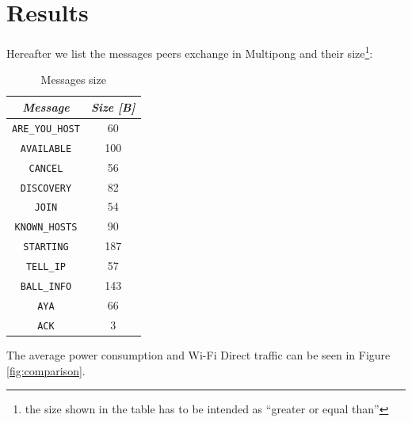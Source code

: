 \section{Results}

Hereafter we list the messages peers exchange in Multipong and their
size\footnote{the size shown in the table has to be intended as ``greater or
equal than''}:

\begin{table}[H]
  \centering
  \begin{tabular}{cc}
    \textbf{\textit{Message}} & \textbf{\textit{Size [B]}} \\
    \hline
    \texttt{ARE\_YOU\_HOST} & 60 \\
    \hline
    \texttt{AVAILABLE} & 100 \\
    \hline
    \texttt{CANCEL} & 56 \\
    \hline
    \texttt{DISCOVERY} & 82 \\
    \hline
    \texttt{JOIN} & 54 \\
    \hline
    \texttt{KNOWN\_HOSTS} & 90 \\
    \hline
    \texttt{STARTING} & 187 \\
    \hline
    \texttt{TELL\_IP} & 57 \\
    \hline
    \texttt{BALL\_INFO} & 143 \\
    \hline
    \texttt{AYA} & 66 \\
    \hline
    \texttt{ACK} & 3 \\
    \hline
  \end{tabular}
  \caption{Messages size}
  \label{tab:sizes}
\end{table}

The average power consumption and Wi-Fi Direct traffic can be seen in Figure
\ref{fig:comparison}.

